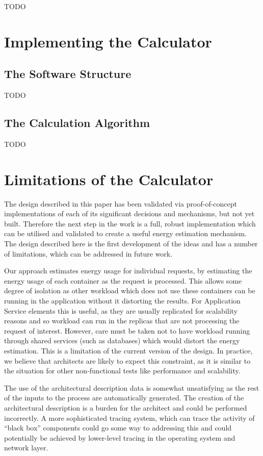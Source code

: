 TODO

\section{Implementing the Calculator}

\subsection{The Software Structure}

TODO

\subsection{The Calculation Algorithm}

TODO

\section{Limitations of the Calculator}

The design described in this paper has been validated via proof-of-concept implementations of each of its significant decisions and mechanisms, but not yet built.  Therefore the next step in the work is a full, robust implementation which can be utilised and validated to create a useful energy estimation mechanism.
The design described here is the first development of the ideas and has a number of limitations, which can be addressed in future work.

Our approach estimates energy usage for individual requests, by estimating the energy usage of each container as the request is processed.  This allows some degree of isolation as other workload which does not use these containers can be running in the application without it distorting the results.  For Application Service elements this is useful, as they are usually replicated for scalability reasons and so workload can run in the replicas that are not processing the request of interest.  However, care must be taken not to have workload running through shared services (such as databases) which would distort the energy estimation.  This is a limitation of the current version of the design. In practice, we believe that architects are likely to expect this constraint, as it is similar to the situation for other non-functional tests like performance and scalability.

The use of the architectural description data is somewhat unsatisfying as the rest of the inputs to the process are automatically generated.  The creation of the architectural description is a burden for the architect and could be performed incorrectly.  A more sophisticated tracing system, which can trace the activity of “black box” components could go some way to addressing this and could potentially be achieved by lower-level tracing in the operating system and network layer.


